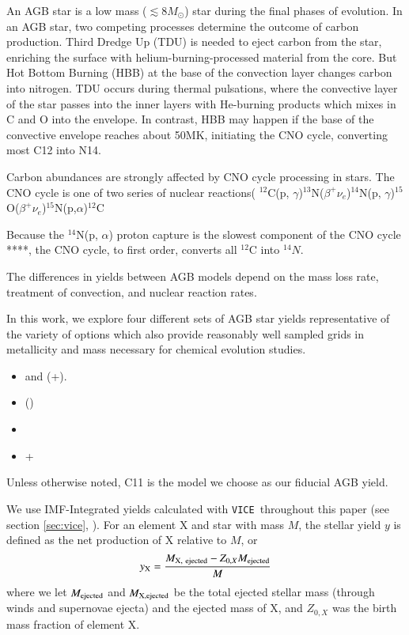 \documentclass[12pt,oneside]{book}
\newcommand{\cristallo}{\citetalias{cristallo+11}+\citetalias{cristallo+15}}
\newcommand{\karakas}{\citetalias{karakas10}}
\newcommand{\kl}{\citetalias{KL16}+\citetalias{karakas+18}}
\newcommand{\ventura}{\citetalias{ventura+13}}
\newcommand{\VICE}{\texttt{VICE}}
\newcommand{\sun}{\ensuremath{\odot}}
\begin{document}
An AGB star is a low mass ($\lesssim 8 M_{\sun}$) star during the final phases of evolution.  In an AGB star, two competing processes determine the outcome of carbon production.
Third Dredge Up (TDU) is needed to eject carbon from the star, enriching the surface with helium-burning-processed material from the core. But Hot Bottom Burning (HBB) at the base of the convection layer changes carbon into nitrogen. 
TDU occurs during thermal pulsations, where the convective layer of the star passes into the inner layers with He-burning products which mixes in C and O into the envelope. In contrast, HBB may happen if the base of the convective envelope reaches about 50MK, initiating the CNO cycle, converting most C12 into N14. 

Carbon abundances are strongly affected by CNO cycle processing in stars. The CNO cycle is one of two series of nuclear reactions( $^{12}$C(p, $\gamma$)$^{13}$N($\beta^+ \nu_e$)$^{14}$N(p, $\gamma$)$^{15}$O($\beta^+\nu_e$)$^{15}$N(p,$\alpha$)$^{12}$C

Because the $^{14}$N(p, $\alpha$) proton capture is the slowest component of the CNO cycle ****, the CNO cycle, to first order, converts all $^{12}$C into $^{14}N$. 

The differences in yields between AGB models depend on the mass loss rate, treatment of convection, and nuclear reaction rates. 

In this work, we explore four different sets of AGB star yields representative of the variety of options which also provide reasonably well sampled grids in metallicity and mass necessary for chemical evolution studies.
\begin{itemize}
    \item \citet{cristallo+11} and \citet{cristallo+15} (\cristallo).
    \item \citet{karakas10} (\karakas)
    \item \citet{ventura+13} \ventura
    \item \citet{KL16} \citet{karakas+18} \kl
\end{itemize}
Unless otherwise noted, C11 is the model we choose as our fiducial AGB yield. 

We use IMF-Integrated yields calculated with \VICE~throughout this paper (see
section \ref{sec:vice}, \citet{james+21, james+22}). For an element X and star
with mass $M$, the stellar yield $y$ is defined as the net production of X relative 
to $M$, or
\begin{equation}
    y_{\rm X} = \frac{M_{\rm X,\ ejected} - Z_{0, X} M_{\rm ejected}}{M}   
\end{equation}
where we let $M_{\rm ejected}$ and $M_{\rm X, ejected}$ be the total ejected
stellar mass (through winds and supernovae ejecta) and the ejected mass of X,
and $Z_{0, X}$ was the birth mass fraction of element X.
\end{document}
